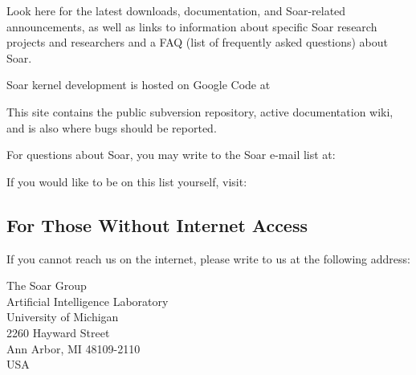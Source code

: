 Look here for the latest downloads, documentation, and Soar-related announcements, as well
as links to information about specific Soar research projects and researchers and a FAQ
(list of frequently asked questions) about Soar.

Soar kernel development is hosted on Google Code at

\hspace{2em}

This site contains the public subversion repository, active
documentation wiki, and is also where bugs should be reported.

For questions about Soar, you may write to the Soar e-mail list at:

\hspace{2em}

If you would like to be on this list yourself, visit:

\hspace{2em}





\subsection*{For Those Without Internet Access}

If you cannot reach us on the internet, please write to us at the following 
address:

\begin{flushleft}
\hspace{2em}The Soar Group \\
\hspace{2em}Artificial Intelligence Laboratory \\
\hspace{2em}University of Michigan\\
\hspace{2em}2260 Hayward Street\\
\hspace{2em}Ann Arbor, MI 48109-2110 \\
\hspace{2em}USA 
\end{flushleft}

